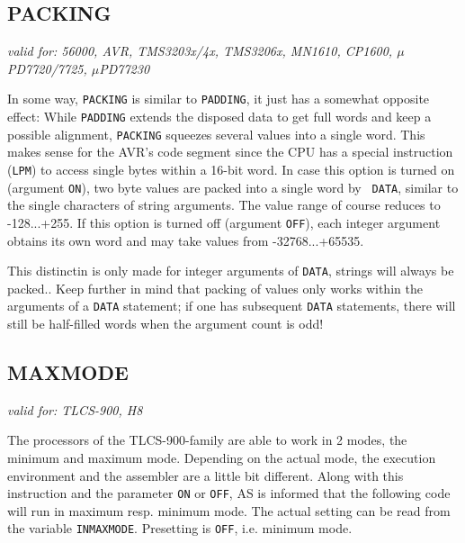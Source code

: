 \documentclass[12pt,twoside]{report}
\makeatletter
\newcommand{\tty}[1]{{\tt #1}}
\newcommand{\ttindex}[1]{\index{#1@{\tt #1}}}
\newcommand{\asname}{{AS}}
\makeatother
\begin{document}

\subsection{PACKING}
\ttindex{PACKING}\label{SectPACKING}

{\em valid for: 56000, AVR, TMS3203x/4x, TMS3206x, MN1610, CP1600,
     $\mu$PD7720/7725, $\mu$PD77230}

In some way, {\tt PACKING} is similar to {\tt PADDING}, it just has a
somewhat opposite effect: While {\tt PADDING} extends the disposed data to
get full words and keep a possible alignment, {\tt PACKING} squeezes
several values into a single word.  This makes sense for the AVR's code
segment since the CPU has a special instruction ({\tt LPM}) to access
single bytes within a 16-bit word.  In case this option is turned on
(argument {\tt ON}), two byte values are packed into a single word by {\tt
DATA}, similar to the single characters of string arguments.  The value
range of course reduces to -128...+255.  If this option is turned off
(argument {\tt OFF}), each integer argument obtains its own word and may
take values from -32768...+65535.

This distinctin is only made for integer arguments of {\tt DATA}, strings
will always be packed..  Keep further in mind that packing of values only
works within the arguments of a {\tt DATA} statement; if one has
subsequent {\tt DATA} statements, there will still be half-filled words
when the argument count is odd!


\subsection{MAXMODE}
\ttindex{MAXMODE}

{\em valid for: TLCS-900, H8}

The processors of the TLCS-900-family are able to work in 2 modes, the
minimum and maximum mode.  Depending on the actual mode, the execution
environment and the assembler are a little bit different. Along with this
instruction and the parameter \tty{ON} or \tty{OFF}, \asname{} is informed that the
following code will run in maximum resp. minimum mode.  The actual setting
can be read from the variable \tty{INMAXMODE}.  Presetting is \tty{OFF},
i.e. minimum mode.
\end{document}
